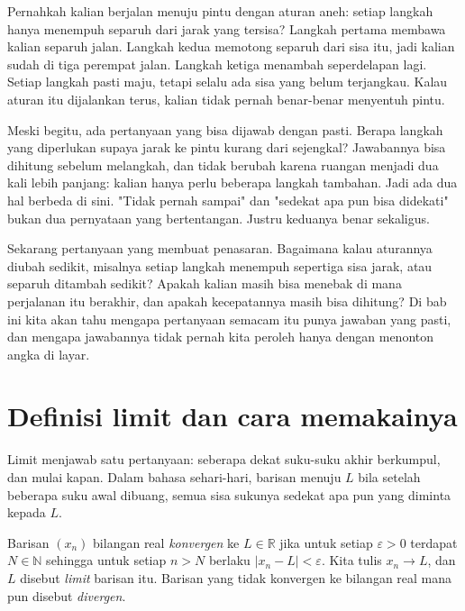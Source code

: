 \begin{untukanak}
Pernahkah kalian berjalan menuju pintu dengan aturan aneh: setiap langkah hanya
menempuh separuh dari jarak yang tersisa? Langkah pertama membawa kalian separuh
jalan. Langkah kedua memotong separuh dari sisa itu, jadi kalian sudah di tiga
perempat jalan. Langkah ketiga menambah seperdelapan lagi. Setiap langkah pasti
maju, tetapi selalu ada sisa yang belum terjangkau. Kalau aturan itu dijalankan
terus, kalian tidak pernah benar-benar menyentuh pintu.

Meski begitu, ada pertanyaan yang bisa dijawab dengan pasti. Berapa langkah yang
diperlukan supaya jarak ke pintu kurang dari sejengkal? Jawabannya bisa dihitung
sebelum melangkah, dan tidak berubah karena ruangan menjadi dua kali lebih panjang:
kalian hanya perlu beberapa langkah tambahan. Jadi ada dua hal berbeda di sini.
"Tidak pernah sampai" dan "sedekat apa pun bisa didekati" bukan dua pernyataan
yang bertentangan. Justru keduanya benar sekaligus.

Sekarang pertanyaan yang membuat penasaran. Bagaimana kalau aturannya diubah
sedikit, misalnya setiap langkah menempuh sepertiga sisa jarak, atau separuh
ditambah sedikit? Apakah kalian masih bisa menebak di mana perjalanan itu berakhir,
dan apakah kecepatannya masih bisa dihitung? Di bab ini kita akan tahu mengapa
pertanyaan semacam itu punya jawaban yang pasti, dan mengapa jawabannya tidak
pernah kita peroleh hanya dengan menonton angka di layar.
\end{untukanak}

\section{Definisi limit dan cara memakainya}


Limit menjawab satu pertanyaan: seberapa dekat suku-suku akhir berkumpul, dan mulai
kapan. Dalam bahasa sehari-hari, barisan menuju $L$ bila setelah beberapa suku awal
dibuang, semua sisa sukunya sedekat apa pun yang diminta kepada $L$.

\begin{definisi}[Kekonvergenan]
Barisan $(x_n)$ bilangan real \emph{konvergen} ke $L \in \mathbb{R}$ jika untuk
setiap $\varepsilon>0$ terdapat $N \in \mathbb{N}$ sehingga untuk setiap $n>N$
berlaku $|x_n-L|<\varepsilon$. Kita tulis $x_n \to L$, dan $L$ disebut
\emph{limit} barisan itu. Barisan yang tidak konvergen ke
bilangan real mana pun disebut \emph{divergen}.
\end{definisi}

